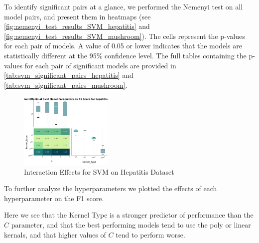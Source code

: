 To identify significant pairs at a glance, we performed the Nemenyi test on all model pairs,
and present them in heatmaps (see \autoref{fig:nemenyi_test_results_SVM_hepatitis} and \autoref{fig:nemenyi_test_results_SVM_mushroom}).
The cells represent the p-values for each pair of models. A value of 0.05 or lower indicates that the models are statistically different
at the 95\% confidence level. The full tables containing the p-values for each pair of significant models are provided in \autoref{tab:svm_significant_pairs_hepatitis} and \autoref{tab:svm_significant_pairs_mushroom}.




\begin{figure}
    \centering
    \includegraphics[width=0.4\textwidth]{figures/interaction_effects_SVM_hepatitis.png}
    \caption{Interaction Effects for SVM on Hepatitis Dataset}
    \label{fig:interaction_effects_SVM_hepatitis}
\end{figure}

To further analyze the hyperparameters we plotted the effects of each hyperparameter on the F1 score.

Here we see that the Kernel Type is a stronger predictor of performance than the $C$ parameter, and that
the best performing models tend to use the poly or linear kernals, and that higher values of $C$ tend to perform worse.
